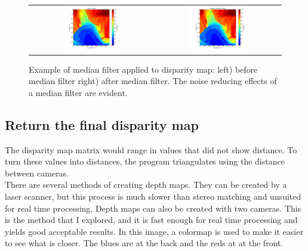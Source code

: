 \documentclass[11pt,fleqn]{article}
\begin{document}
\begin{figure}[!ht]
\centering
\begin{tabular}{cc}
\includegraphics[width=0.49\textwidth, trim=60 10 25 10, clip]{images/median1.png} &
\includegraphics[width=0.49\textwidth, trim=60 10 25 10, clip]{images/median2.png}\\
\end{tabular}
\caption[Example of median filter applied to disparity map]{Example of median filter applied to disparity map: left) before median filter right) after median filter. 
The noise reducing effects of a median filter are evident.}
\label{fig:medians}
\end{figure}

\subsection{Return the final disparity map}

The disparity map matrix would range in values that did not show distance. To turn these values into distances, the program triangulates using the distance between cameras.\\[5pt]
%
There are several methods of creating depth maps.
They can be created by a laser scanner, but this process is much slower than stereo matching and unsuited for real time processing. Depth maps can also be created with two cameras. This is the method that I explored, and it is fast enough for real time processing and yields good acceptable results. In this image, a colormap is used to make it easier to see what is closer. The blues are at the back and the reds at at the front.
\end{document}
